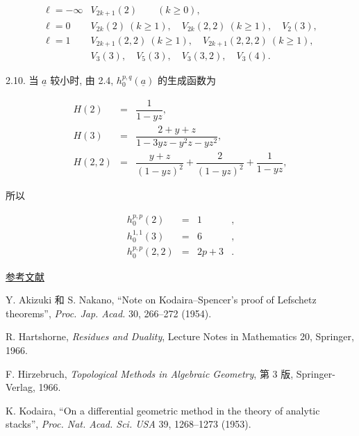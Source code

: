 
\begin{equation*}
\begin{array}{ll}
\ell=-\infty & V_{2k+1}(2) \qquad (k\geq0),\\[2ex]
\ell=0 & V_{2k}(2)\ (k\geq1),\quad
          V_{2k}(2,2)\ (k\geq1),\quad V_2(3),\\[2ex]
\ell=1 & V_{2k+1}(2,2)\ (k\geq1),\quad
          V_{2k+1}(2,2,2)\ (k\geq1),\\
& V_3(3),\quad V_5(3),\quad V_3(3,2),\quad V_3(4).
\end{array}
\end{equation*}

2.10. 当 $\underline a$ 较小时, 由 2.4, $h_0^{p,q}(\underline a)$ 的生成函数为

\begin{equation*}
\begin{array}{rcl}
H(2)&=&\dfrac{1}{1-yz},\\[3ex]
H(3)&=&\dfrac{2+y+z}{1-3yz-y^2z-yz^2},\\[3ex]
H(2,2)&=&\dfrac{y+z}{(1-yz)^2}
          +\dfrac{2}{(1-yz)^2}+\dfrac{1}{1-yz},
\end{array}
\end{equation*}

所以

\begin{equation*}
\begin{array}{rcll}
h_0^{p,p}(2)&=&1&,\\[2ex]
h_0^{1,1}(3)&=&6&,\\[2ex]
h_0^{p,p}(2,2)&=&2p+3&.
\end{array}
\end{equation*}


\bigskip
\begin{center}
\underline{参考文献}
\end{center}

\begin{enumerate}[label={[\arabic*]},leftmargin=3em]
\item Y. Akizuki 和 S. Nakano, ``Note on Kodaira--Spencer's proof of
Lefschetz theorems'', \emph{Proc. Jap. Acad.} 30, 266--272 (1954).

\item R. Hartshorne, \emph{Residues and Duality}, Lecture Notes in
Mathematics 20, Springer, 1966.

\item F. Hirzebruch, \emph{Topological Methods in Algebraic Geometry},
第 3 版, Springer-Verlag, 1966.

\item K. Kodaira, ``On a differential geometric method in the theory of
analytic stacks'', \emph{Proc. Nat. Acad. Sci. USA} 39, 1268--1273
(1953).
\end{enumerate}
